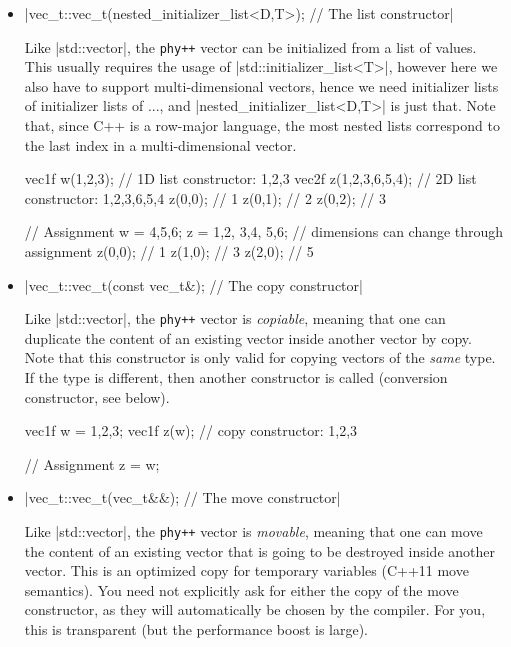 \documentclass[12pt]{report}
\newcommand{\phypp}{\texttt{phy++}\xspace}
\newcommand{\stdvec}{\cppinline|std::vector|\xspace}
\newenvironment{example}
{
    \begin{mdframed}[style=example,frametitle={Example}]
}
{
    \end{mdframed}
}
\begin{document}
\begin{itemize}
\item \cppinline|vec_t::vec_t(nested_initializer_list<D,T>); // The list constructor|

Like \stdvec, the \phypp vector can be initialized from a list of values. This usually requires the usage of \cppinline|std::initializer_list<T>|, however here we also have to support multi-dimensional vectors, hence we need initializer lists of initializer lists of ..., and \cppinline|nested_initializer_list<D,T>| is just that. Note that, since C++ is a row-major language, the most nested lists correspond to the last index in a multi-dimensional vector.

\begin{example}
\begin{cppcode}
vec1f w({1,2,3}); // 1D list constructor: {1,2,3}
vec2f z({{1,2,3},{6,5,4}}); // 2D list constructor: {{1,2,3},{6,5,4}}
z(0,0); // 1
z(0,1); // 2
z(0,2); // 3

// Assignment
w = {4,5,6};
z = {{1,2}, {3,4}, {5,6}}; // dimensions can change through assignment
z(0,0); // 1
z(1,0); // 3
z(2,0); // 5
\end{cppcode}
\end{example}

\item \cppinline|vec_t::vec_t(const vec_t&); // The copy constructor|

Like \stdvec, the \phypp vector is \emph{copiable}, meaning that one can duplicate the content of an existing vector inside another vector by copy. Note that this constructor is only valid for copying vectors of the \emph{same} type. If the type is different, then another constructor is called (conversion constructor, see below).

\begin{example}
\begin{cppcode}
vec1f w = {1,2,3};
vec1f z(w); // copy constructor: {1,2,3}

// Assignment
z = w;
\end{cppcode}
\end{example}

\item \cppinline|vec_t::vec_t(vec_t&&); // The move constructor|

Like \stdvec, the \phypp vector is \emph{movable}, meaning that one can move the content of an existing vector that is going to be destroyed inside another vector. This is an optimized copy for temporary variables (C++11 move semantics). You need not explicitly ask for either the copy of the move constructor, as they will automatically be chosen by the compiler. For you, this is transparent (but the performance boost is large).


\end{itemize}
\end{document}
